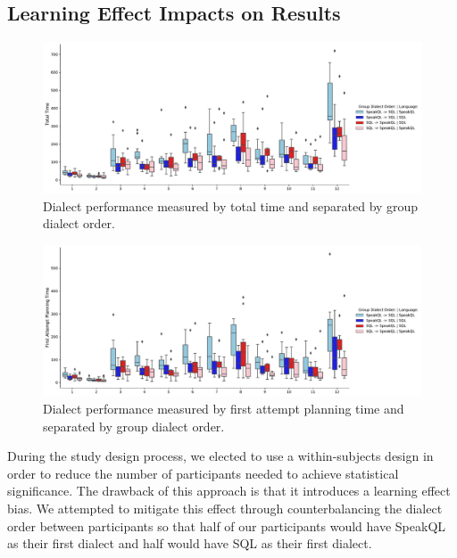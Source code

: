 \subsection{Learning Effect Impacts on Results}

\begin{figure}
  \centering
  \includegraphics[width=\linewidth]{figures/query-planning-total-time-withgroups-boxplot.pdf}
  \caption{Dialect performance measured by total time and separated by group dialect order.}
  \label{fig:performancebygrouptotaltime}
\end{figure}

\begin{figure}
  \centering
  \includegraphics[width=\linewidth]{figures/query-planning-first-attempt-time-withgroups-boxplot.pdf}
  \caption{Dialect performance measured by first attempt planning time and separated by group dialect order.}
  \label{fig:performancebygroupfirstattempttime}
\end{figure}


During the study design process, we elected to use a within-subjects design in order to reduce the number of participants needed to achieve statistical significance. 
The drawback of this approach is that it introduces a learning effect bias. 
We attempted to mitigate this effect through counterbalancing the dialect order between participants so that half of our participants would have SpeakQL as their first dialect and half would have SQL as their first dialect. 

